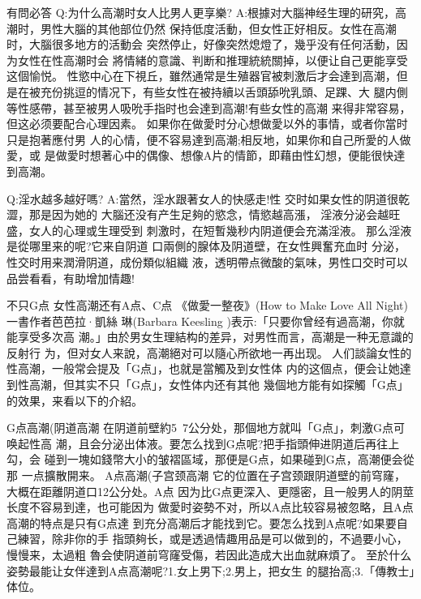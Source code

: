 \documentclass[12pt,UTF8]{ctexbook}
\begin{document}
有問必答
Q:为什么高潮时女人比男人更享樂?
A:根據对大腦神经生理的研究，高潮时，男性大腦的其他部位仍然
保持低度活動，但女性正好相反。女性在高潮时，大腦很多地方的活動会
突然停止，好像突然熄燈了，幾乎没有任何活動，因为女性在性高潮时会
將情緒的意識、判断和推理統統關掉，以便让自己更能享受这個愉悦。
性慾中心在下視丘，雖然通常是生殖器官被刺激后才会達到高潮，但
是在被充份挑逗的情况下，有些女性在被持續以舌頭舔吮乳頭、足踝、大
腿内側等性感帶，甚至被男人吸吮手指时也会達到高潮!有些女性的高潮
来得非常容易，但这必须要配合心理因素。
如果你在做愛时分心想做愛以外的事情，或者你當时只是抱著應付男
人的心情，便不容易達到高潮;相反地，如果你和自己所愛的人做愛，或
是做愛时想著心中的偶像、想像A片的情節，即藉由性幻想，便能很快達
到高潮。

Q:淫水越多越好嗎?
A:當然，淫水跟著女人的快感走!性
交时如果女性的阴道很乾澀，那是因为她的
大腦还没有产生足夠的慾念，情慾越高漲，
淫液分泌会越旺盛，女人的心理或生理受到
刺激时，在短暫幾秒内阴道便会充滿淫液。
那么淫液是從哪里来的呢?它来自阴道
口兩側的腺体及阴道壁，在女性興奮充血时
分泌，性交时用来潤滑阴道，成份類似組織
液，透明帶点微酸的氣味，男性口交时可以
品尝看看，有助增加情趣!

不只G点
女性高潮还有A点、C点
《做愛一整夜》(How to Make Love All Night)一書作者芭芭拉·凱絲
琳(Barbara Keesling )表示:「只要你曾经有過高潮，你就能享受多次高
潮。」由於男女生理結构的差异，对男性而言，高潮是一种无意識的反射行
为，但对女人来說，高潮絕对可以隨心所欲地一再出现。
人们談論女性的性高潮，一般常会提及「G点」，也就是當觸及到女性体
内的这個点，便会让她達到性高潮，但其实不只「G点」，女性体内还有其他
幾個地方能有如探觸「G点」的效果，来看以下的介紹。

G点高潮(阴道高潮
在阴道前壁約5~7公分处，那個地方就叫「G点」，刺激G点可唤起性高
潮，且会分泌出体液。要怎么找到G点呢?把手指頭伸进阴道后再往上勾，会
碰到一塊如錢幣大小的皱褶區域，那便是G点，如果碰到G点，高潮便会從那
一点擴散開来。
A点高潮(子宫颈高潮
它的位置在子宫颈跟阴道壁的前穹窿，大概在距離阴道口12公分处。A点
因为比G点更深入、更隱密，且一般男人的阴莖长度不容易到達，也可能因为
做愛时姿勢不对，所以A点比较容易被忽略，且A点高潮的特点是只有G点達
到充分高潮后才能找到它。要怎么找到A点呢?如果要自己練習，除非你的手
指頭夠长，或是透過情趣用品是可以做到的，不過要小心，慢慢来，太過粗
魯会使阴道前穹窿受傷，若因此造成大出血就麻煩了。
至於什么姿勢最能让女伴達到A点高潮呢?1.女上男下;2.男上，把女生
的腿抬高;3.「傳教士」体位。
\end{document}
